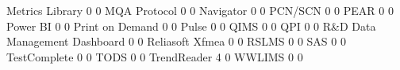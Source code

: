 \documentclass{article}
\begin{document}
\begin{Schunk}
\begin{Soutput}
  Metrics Library                                                      0    0
  MQA Protocol                                                         0    0
  Navigator                                                            0    0
  PCN/SCN                                                              0    0
  PEAR                                                                 0    0
  Power BI                                                             0    0
  Print on Demand                                                      0    0
  Pulse                                                                0    0
  QIMS                                                                 0    0
  QPI                                                                  0    0
  R&D Data Management Dashboard                                        0    0
  Reliasoft Xfmea                                                      0    0
  RSLMS                                                                0    0
  SAS                                                                  0    0
  TestComplete                                                         0    0
  TODS                                                                 0    0
  TrendReader                                                          4    0
  WWLIMS                                                               0    0
                                                           

\end{Soutput}
\end{Schunk}
\end{document}

